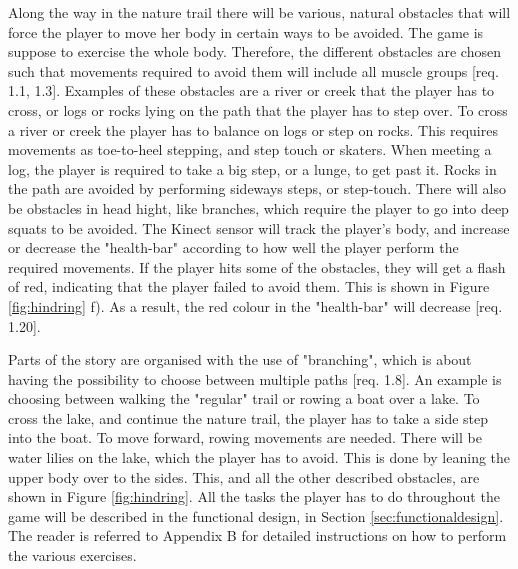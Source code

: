 Along the way in the nature trail there will be various, natural obstacles that will force the player to move her body in certain ways to be avoided. The game is suppose to exercise the whole body. Therefore, the different obstacles are chosen such that movements required to avoid them will include all muscle groups [req. 1.1, 1.3]. Examples of these obstacles are a river or creek that the player has to cross, or logs or rocks lying on the path that the player has to step over. To cross a river or creek the player has to balance on logs or step on rocks. This requires movements as toe-to-heel stepping, and step touch or skaters. When meeting a log, the player is required to take a big step, or a lunge, to get past it. Rocks in the path are avoided by performing sideways steps, or step-touch. There will also be obstacles in head hight, like branches, which require the player to go into deep squats to be avoided. The Kinect sensor will track the player's body, and increase or decrease the "health-bar" according to how well the player perform the required movements. If the player hits some of the obstacles, they will get a flash of red, indicating that the player failed to avoid them. This is shown in Figure \ref{fig:hindring} f). As a result, the red colour in the "health-bar" will decrease [req. 1.20].

Parts of the story are organised with the use of "branching", which is about having the possibility to choose between multiple paths [req. 1.8]. An example is choosing between walking the "regular" trail or rowing a boat over a lake. To cross the lake, and continue the nature trail, the player has to take a side step into the boat. To move forward, rowing movements are needed. There will be water lilies on the lake, which the player has to avoid. This is done by leaning the upper body over to the sides. This, and all the other described obstacles, are shown in Figure \ref{fig:hindring}. All the tasks the player has to do throughout the game will be described in the functional design, in Section \ref{sec:functionaldesign}. The reader is referred to Appendix B for detailed instructions on how to perform the various exercises.

